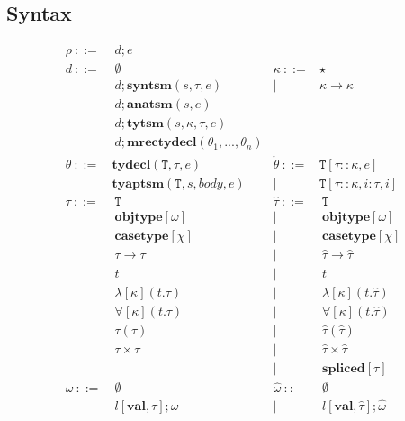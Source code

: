 \documentclass{sig-alternate}
\newcommand{\T}{\mathtt{T}}
\begin{document}
\subsection{Syntax}
\[
\begin{array}{rlrlrl}
  \rho    ~::=&~ {d};e\\        
  {d}   ~::=&~ \emptyset                  & \kappa      ~::=& \star\\
        | ~ &~ {d}; \mathbf{syntsm}(s,\tau,e)     &   | ~ & \kappa\rightarrow\kappa\\
        | ~ &~ {d}; \mathbf{anatsm}(s,e)        \\
        | ~ &~ {d};\mathbf{tytsm}(s,\kappa,\tau,e)        \\
        | ~ &~{d};\mathbf{mrectydecl}(\theta_1,...,\theta_n)\\
  \theta  ~::=&\mathbf{tydecl}(\T,\tau,e)       &\mathring\theta~::=&\T[\tau::\kappa,e]\\
      |~&\mathbf{tyaptsm}(\T,s,body,e)      &|~&\T[\tau::\kappa,i:\tau,i]\\
  \tau    ~::=&~ \T       &\hat{\tau} ~::=&~ \T\\
        |~  & ~ \mathbf{objtype}[\omega]    &|~ &~ \mathbf{objtype}[\omega]       \\
        |~  & ~ \mathbf{casetype}[\chi]     &|~ &~ \mathbf{casetype}[\chi]        \\
        |~  & ~ \tau\rightarrow\tau       &|~ &~ \hat\tau\rightarrow\hat\tau  \\
        |~  & ~ t               &|~ &~ t                  \\
        |~  & ~ \lambda[\kappa](t.\tau)     &|~ &~ \lambda[\kappa](t.\hat{\tau})\\
        |~  & ~ \forall[\kappa](t.\tau)       &|~ &~ \forall[\kappa](t.\hat{\tau})\\
        |~  & ~ \tau(\tau)            &|~ &~ \hat{\tau}(\hat{\tau})\\
        |~  & ~ \tau \times \tau        &|~ &~ \hat{\tau}\times\hat{\tau}\\
            &                 &|~ &~ \mathbf{spliced}[\tau]\\
  \omega ~::=&~   \emptyset             &\hat{\omega} ~::&~ \emptyset\\
   |~&    ~l[\mathbf{val}, \tau];\omega       &|~ & ~l[\mathbf{val}, \hat\tau];\hat\omega \\

\end{array}\]
\end{document}
